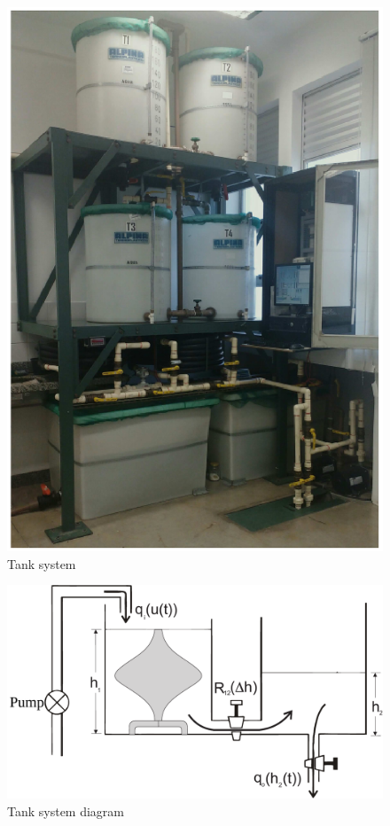 \begin{figure}[ht!]
  \centering \captionsetup{justification=centering}
  \includegraphics[height=.5\textheight]{imgs/tanks-real}
  \caption{Tank system}%
  \label{fig:tanks-real}
\end{figure}

\begin{figure}[ht!]
  \centering \captionsetup{justification=centering}
  \includegraphics[width=0.9\linewidth]{imgs/tanks}
  \caption{Tank system diagram}%
  \label{fig:tanks}
\end{figure}

